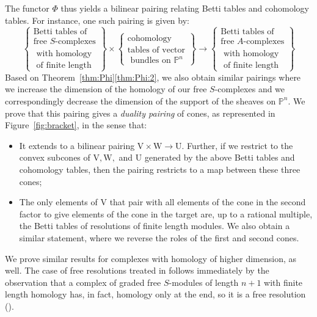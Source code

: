 \documentclass[12pt]{amsart}
\theoremstyle{definition}
\theoremstyle{remark}
\newcommand{\PP}{\mathbb{P}}
\newcommand{\UU}{\mathrm{U}}
\newcommand{\VV}{\mathrm{V}}
\newcommand{\WW}{\mathrm{W}}
\begin{document}
The functor $\Phi$ thus yields a bilinear pairing relating Betti tables and cohomology tables.  For instance, one such pairing is given by:
\begin{equation*}%
\label{eqn:**}
%
\left\{\begin{matrix}
\text{Betti tables of} \\ \text{free $S$-complexes}\\
\text{ with homology}\\ \text{ of finite length}
\end{matrix}\right\}
%
\times 
%
\left\{\begin{matrix}
\text{cohomology }\\
\text{tables of vector}\\
\text{ bundles on } \PP^n
\end{matrix}\right\}
%
\longrightarrow
\left\{\begin{matrix}
\text{Betti tables of} \\ \text{free $A$-complexes}\\
\text{ with homology}\\ \text{ of finite length}
\end{matrix}\right\}
\end{equation*}
Based on Theorem~\ref{thm:Phi}\eqref{thm:Phi:2}, we also obtain similar pairings where we increase the dimension of the homology of our free $S$-complexes and we correspondingly decrease the dimension of the support of the sheaves on $\mathbb P^n$.  We prove that this pairing gives a  \emph{duality pairing} of cones, as represented in Figure~\ref{fig:bracket},
in the sense that:
\begin{itemize}
\item It extends to a bilinear pairing $\VV\times \WW\to \UU$.  Further, if we restrict to the convex subcones of $\VV, \WW,$ and $\UU$ generated by the above Betti tables and cohomology tables, then the pairing restricts to a map between these three cones;
\item The only elements of $\VV$ that pair with all elements of the cone in the second factor
 to give elements of the cone in the target are, up to a rational multiple, the Betti tables of  resolutions of finite length modules.  We also obtain a similar statement, where we reverse the roles of 
 the first and second cones.
\end{itemize} 
 We prove similar results for complexes with homology of higher dimension, as well. The case of free resolutions treated in \cite{eis-schrey1} follows immediately by the observation that a  complex of graded free $S$-modules of length $n+1$ with finite length homology has, in fact, homology only at the end, so it is a free resolution (\cite{}).
\end{document}
